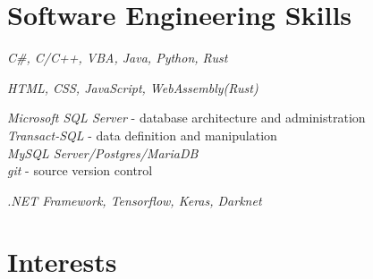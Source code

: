 \documentclass[10pt]{article} %
\begin{document}



\section{Software Engineering Skills}

{
\textit{C\#, C/C++, VBA, Java, Python, Rust}\\
}


{
\textit{HTML, CSS, JavaScript, WebAssembly(Rust)}\\
}


{
\textit{Microsoft SQL Server} - database architecture and administration\\
\textit{Transact-SQL} - data definition and manipulation\\
\textit{MySQL Server/Postgres/MariaDB}\\
\textit{git} - source version control
}


{
\textit{.NET Framework, Tensorflow, Keras, Darknet}
}


\section{Interests}

\end{document}
